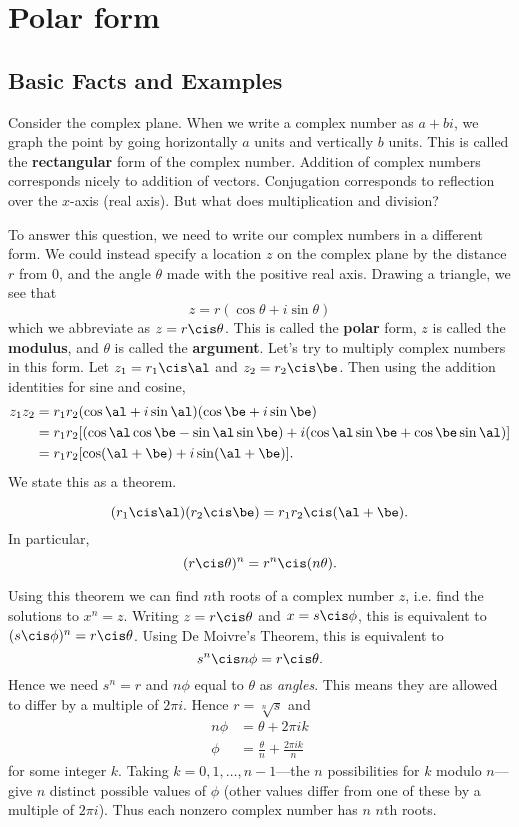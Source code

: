\section{Polar form}
\subsection{Basic Facts and Examples}
Consider the complex plane.
When we write a complex number as $a+bi$, we graph the point by going horizontally $a$ units and vertically $b$ units. This is called the \textbf{rectangular} form of the complex number. Addition of complex numbers corresponds nicely to addition of vectors. Conjugation corresponds to reflection over the $x$-axis (real axis). But what does multiplication and division?

To answer this question, we need to write our complex numbers in a different form. We could instead specify a location $z$ on the complex plane by the distance $r$ from 0, and the angle $\theta$ made with the positive real axis. Drawing a triangle, we see that
\[
z=r(\cos \theta+i\sin\theta)
\]
which we abbreviate as $z=r\cis \theta$. This is called the \textbf{polar} form, $z$ is called the \textbf{modulus}, and $\theta$ is called the \textbf{argument}.
Let's try to multiply complex numbers in this form. Let $z_1=r_1\cis \al$ and $z_2=r_2\cis \be$. Then using the addition identities for sine and cosine,
\begin{align*}
z_1z_2&=r_1r_2(\cos \al+i\sin \al)(\cos \be+i\sin \be)\\
&=r_1r_2[(\cos \al\cos \be-\sin\al\sin\be)+i(\cos\al\sin\be+\cos\be \sin \al)]\\
&=r_1r_2[\cos(\al+\be)+i\sin(\al+\be)].
\end{align*}
We state this as a theorem.
\begin{thm}[De Moivre]
\[(r_1\cis \al)(r_2\cis \be)=r_1r_2\cis (\al+\be).\]
In particular,
\[
(r\cis\theta)^n=r^n\cis(n\theta).
\]
\end{thm}

Using this theorem we can find $n$th roots of a complex number $z$, i.e. find the solutions to $x^n=z$. Writing $z=r\cis\theta$ and $x=s\cis \phi$, this is equivalent to $(s\cis \phi)^n=r\cis \theta$. Using De Moivre's Theorem, this is equivalent to
\[
s^n\cis n\phi=r\cis \theta.
\]
Hence we need $s^n=r$ and $n\phi$ equal to $\theta$ as {\it angles}. This means they are allowed to differ by a multiple of $2\pi i$. Hence $r=\sqrt[n]s$ and
\begin{align*}
n\phi &=\theta+2\pi ik\\
\phi&=\frac{\theta}{n}+\frac{2\pi ik}{n}
\end{align*}
for some integer $k$. Taking $k=0,1,\ldots, n-1$---the $n$ possibilities for $k$ modulo $n$---give $n$ distinct possible values of $\phi$ (other values differ from one of these by a multiple of $2\pi i$). Thus each nonzero complex number has $n$ $n$th roots.

